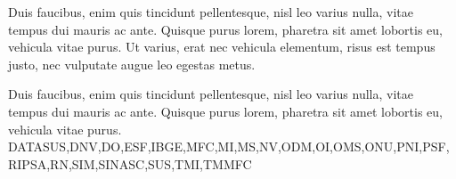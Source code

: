 Duis faucibus, enim quis tincidunt pellentesque, nisl leo varius nulla, vitae tempus dui mauris ac ante. Quisque purus lorem, pharetra sit amet lobortis eu, vehicula vitae purus. Ut varius, erat nec vehicula elementum, risus est tempus justo, nec vulputate augue leo egestas metus.

	\begin{figure}[h!]
		\centering
	\end{figure}

\lipsum[14]

	\begin{table}[h!]	
		\centering
	\end{table}
	
Duis faucibus, enim quis tincidunt pellentesque, nisl leo varius nulla, vitae tempus dui mauris ac ante. Quisque purus lorem, pharetra sit amet lobortis eu, vehicula vitae purus.
\acrlong{DATASUS},\acrlong{DNV},\acrlong{DO},\acrlong{ESF},\acrlong{IBGE},\acrlong{MFC},\acrlong{MI},\acrlong{MS},\acrlong{NV},\acrlong{ODM},\acrlong{OI},\acrlong{OMS},\acrlong{ONU},\acrlong{PNI},\acrlong{PSF},\acrlong{RIPSA},\acrlong{RN},\acrlong{SIM},\acrlong{SINASC},\acrlong{SUS},\acrlong{TMI},\acrlong{TMMFC}
	